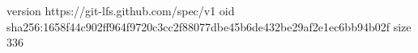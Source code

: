 version https://git-lfs.github.com/spec/v1
oid sha256:1658f44c902ff964f9720c3cc2f88077dbe45b6de432be29af2e1ec6bb94b02f
size 336
